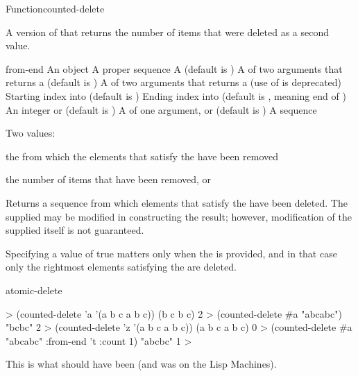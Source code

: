 \documentclass[10pt,twoside,english,pdftex]{article}
\begin{document}
\begin{functiondoc}{Function}{counted-delete}{
     
    }

\fnsyntax

\fnpurpose A version of  that returns the number of items
that were deleted as a second value. 

\fnpackage {}

\fnmodule {}

\fnargs
\begin{args}{from-end}
\arg[item] An object
\arg[sequence] A proper sequence
 A  (default is \nil)
\arg[test] A  of two arguments that returns a
 (default is ) 
 A  of two arguments that returns a
 (use of  is deprecated)
\arg[start] Starting index into  (default is )
\arg[end] Ending index into  (default is \nil, meaning
end of )
\arg[count] An integer or \nil{} (default is \nil)
\arg[key] A  of one argument, or \nil{} (default is \nil)
 A sequence
\end{args}

\fnreturns Two values: 
\begin{tightitemize}
\item the  from which the elements that satisfy the
   have been removed 
\item the number of items that have been removed, or \nil
\end{tightitemize}

\fndescription Returns a sequence from which elements that satisfy the
 have been deleted.  The supplied  may be
modified in constructing the result; however, modification of the supplied
 itself is not guaranteed.

Specifying a  value of true matters only when
the  is provided, and in that case only the rightmost
 elements satisfying the  are deleted.

\begin{alsos}{atomic-delete}
\end{alsos}

\fnexamples
\begin{example}
%
\W\supp
  > (counted-delete 'a '(a b c a b c))
  (b c b c)
  2
  > (counted-delete #\bkslash{}a "abcabc")
  "bcbc"
  2\goodpagebreak
  > (counted-delete 'z '(a b c a b c))
  (a b c a b c)
  0
  > (counted-delete #\bkslash{}a "abcabc" :from-end 't :count 1)
  "abcbc"
  1
  >
\end{example}

\fnnote This is what  should have been (and was on the
Lisp Machines).

\end{functiondoc}
\end{document}

